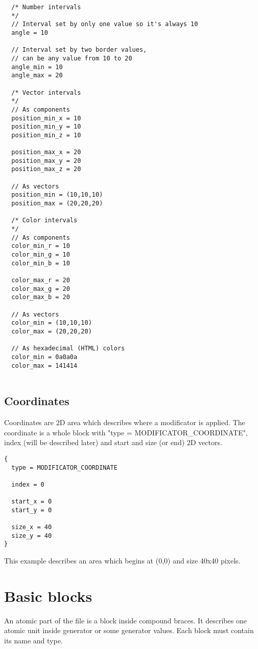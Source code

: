 \documentclass[11pt]{article}
\begin{document}
\begin{verbatim}
  /* Number intervals
  */
  // Interval set by only one value so it's always 10
  angle = 10
  
  // Interval set by two border values, 
  // can be any value from 10 to 20
  angle_min = 10
  angle_max = 20 
  
  /* Vector intervals
  */ 
  // As components
  position_min_x = 10
  position_min_y = 10
  position_min_z = 10
  
  position_max_x = 20
  position_max_y = 20
  position_max_z = 20
  
  // As vectors
  position_min = (10,10,10)
  position_max = (20,20,20)
  
  /* Color intervals
  */
  // As components
  color_min_r = 10
  color_min_g = 10
  color_min_b = 10
  
  color_max_r = 20
  color_max_g = 20
  color_max_b = 20
  
  // As vectors
  color_min = (10,10,10)
  color_max = (20,20,20)
  
  // As hexadecimal (HTML) colors
  color_min = 0a0a0a
  color_max = 141414
  
\end{verbatim}

\subsection{Coordinates}

Coordinates are 2D area which describes 
where a modificator is applied.  The coordinate is a whole 
block with "type = MODIFICATOR\_COORDINATE", index (will be described later)
and start and size (or end) 2D vectors.

\begin{verbatim}
{
  type = MODIFICATOR_COORDINATE

  index = 0

  start_x = 0
  start_y = 0

  size_x = 40
  size_y = 40
}
\end{verbatim}

This example describes an area which begins at (0,0) and size 40x40 pixels.

\section{Basic blocks}

An atomic part of the file is a block inside compound braces. It describes one 
atomic unit inside generator or some generator values. Each block must
contain its name and type.
\end{document}
